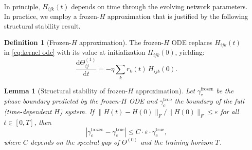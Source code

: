 \documentclass[11pt]{article}
\newtheorem{lemma}[theorem]{Lemma}
\theoremstyle{definition}
\newtheorem{definition}[theorem]{Definition}
\newcommand{\norm}[1]{\lVert #1 \rVert}
\newcommand{\dd}{\mathrm{d}}
\renewcommand{\Theta}{\varTheta}
\begin{document}
In principle, $H_{ijk}(t)$ depends on time through the evolving network parameters. In practice, we employ a frozen-$H$ approximation that is justified by the following structural stability result.

\begin{definition}[Frozen-$H$ approximation]
\label{def:frozen-H}
The frozen-$H$ ODE replaces $H_{ijk}(t)$ in \eqref{eq:kernel-ode} with its value at initialization $H_{ijk}(0)$, yielding:
\begin{equation}
\frac{\dd \Theta^{(1)}_{ij}}{\dd t} = -\eta \sum_k r_k(t)\, H_{ijk}(0).
\end{equation}
\end{definition}

\begin{lemma}[Structural stability of frozen-$H$ approximation]
\label{lem:structural-stability}
Let $\gamma_c^{\mathrm{frozen}}$ be the phase boundary predicted by the frozen-$H$ ODE and $\gamma_c^{\mathrm{true}}$ the boundary of the full (time-dependent $H$) system. If $\norm{H(t) - H(0)}_F / \norm{H(0)}_F \le \varepsilon$ for all $t \in [0, T]$, then
\begin{equation}
\label{eq:structural-stability}
|\gamma_c^{\mathrm{frozen}} - \gamma_c^{\mathrm{true}}| \le C \cdot \varepsilon \cdot \gamma_c^{\mathrm{true}},
\end{equation}
where $C$ depends on the spectral gap of $\Theta^{(0)}$ and the training horizon $T$.
\end{lemma}
\end{document}
